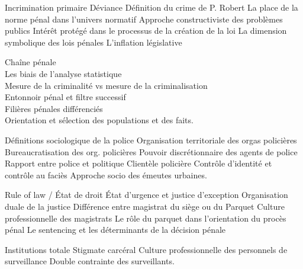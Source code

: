 \documentclass[10pt, a4paper, openany]{book}
\begin{document}
Incrimination primaire
Déviance
Définition du crime de P. Robert
La place de la norme pénal dans l'univers normatif
Approche constructiviste des problèmes publics
Intérêt protégé dans le processus de la création de la loi
La dimension symbolique des lois pénales
L'inflation législative


Chaîne pénale \\
Les biais de l'analyse statistique \\
Mesure de la criminalité vs mesure de la criminalisation \\
Entonnoir pénal et filtre successif \\
Filières pénales différenciés \\
Orientation et sélection des populations et des faits. 


Définitions sociologique de la police
Organisation territoriale des orgas policières
Bureaucratisation des org. policières
Pouvoir discrétionnaire des agents de police
Rapport entre police et politique
Clientèle policière
Contrôle d'identité et contrôle au faciès
Approche socio des émeutes urbaines. 


Rule of law / État de droit
État d'urgence et justice d'exception
Organisation duale de la justice
Différence entre magistrat du siège ou du Parquet
Culture professionnelle des magistrats
Le rôle du parquet dans l'orientation du procès pénal 
Le sentencing et les déterminants de la décision pénale


Institutions totale
Stigmate carcéral
Culture professionnelle des personnels de surveillance
Double contrainte des surveillants. 
\end{document}
